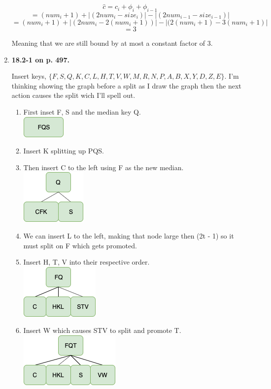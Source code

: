 \documentclass{article}
\begin{document}
\begin{enumerate}
    \[\hat{c} = c_i + \phi_i + \phi_{i - 1}\]
    \[= (num_i + 1) + |(2num_i - size_i)| - |(2num_{i - 1} - size_{i - 1})|\]
    \[= (num_i + 1) + |(2num_i - 2(num_i + 1))| - |(2(num_i + 1) - 3(num_i + 1)|\]
    \[= 3\]

    Meaning that we are still bound by at most a constant factor of 3.

    \item \textbf{18.2-1 on p. 497.}
    
    Insert keys, $\{F, S, Q, K, C, L, H, T, V, W, M, R, N, P, A, B, X, Y, D, Z, E\}$.
    I'm thinking showing the graph before a split as I draw the graph then the next action causes the split wich I'll spell out.

    \begin{enumerate}
      \item First inset F, S and the median key Q.\\
      \includegraphics[scale=0.5]{10a.png}
      \item Insert K splitting up PQS.
      \item Then insert C to the left using F as the new median.\\
      \includegraphics[scale=0.5]{10b.png}
      \item We can insert L to the left, making that node large then (2t - 1) so it must split on F which gets promoted.
      \item Insert H, T, V into their respective order.\\
      \includegraphics[scale=0.5]{10c.png}
      \item Insert W which causes STV to split and promote T.\\
      \includegraphics[scale=0.5]{10d.png}

\end{enumerate}
\end{enumerate}
\end{document}
